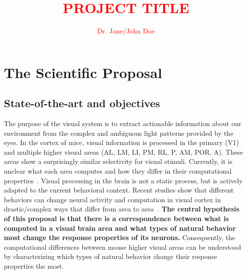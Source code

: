 \documentclass[B2,COG]{ercgrant}
\author{\textcolor{red}{Dr. Jane/John Doe}}
\title{\textcolor{red}{PROJECT TITLE}}
\begin{document}
\maketitle



\chapter{The Scientific Proposal}


\section{State-of-the-art and objectives}\label{sec:stateofart}
The purpose of the visual system is to extract actionable information about our environment from the complex and ambiguous light patterns provided by the eyes. 
In the cortex of mice, visual information is processed in the primary (V1) and multiple higher visual areas (AL, LM, LI, PM, RL, P, AM, POR, A). 
These areas show a surprisingly similar selectivity for visual stimuli.
Currently, it is unclear what each area computes and how they differ in their computational properties~\parencite{Conwell2021-pw}. 
Visual processing in the brain is not a static process, but is actively adapted to the current behavioral context.
Recent studies show that different behaviors can change neural activity and computation in visual cortex in drastic/complex ways that differ from area to area~\parencite{Musall2019-kd,Stringer2019-lt,Franke2022-do}.
\textbf{The central hypothesis of this proposal is that there is a correspondence between what is computed in a visual brain area and what types of natural behavior most change the response properties of its neurons.} Consequently, the computational differences between mouse higher visual areas can be understood by characterizing which types of natural behavior change their response properties the most.
\end{document}
